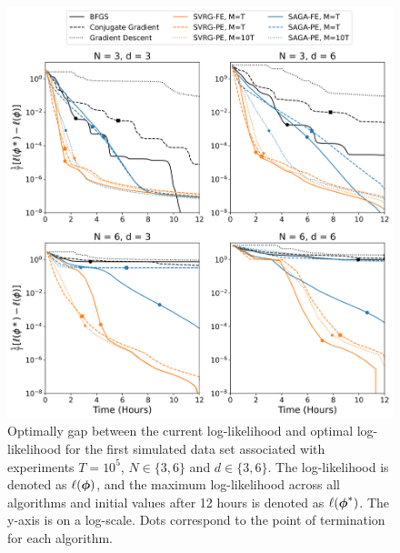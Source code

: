 \documentclass[12pt]{article}
\begin{document}
\begin{figure}[H]
    \centering
    \includegraphics[width=6.5in]{../plt/log-like_v_time_T-100000-000.png}
    \caption{Optimally gap between the current log-likelihood and optimal log-likelihood for the first simulated data set associated with experiments $T=10^{5}$, $N \in \{3,6\}$ and $d \in \{3,6\}$. The log-likelihood is denoted as $\ell(\boldsymbol{\phi})$, and the maximum log-likelihood across all algorithms and initial values after 12 hours is denoted as $\ell(\boldsymbol{\phi}^*)$. The y-axis is on a log-scale. Dots correspond to the point of termination for each algorithm.}
\end{figure}
%
\end{document}
